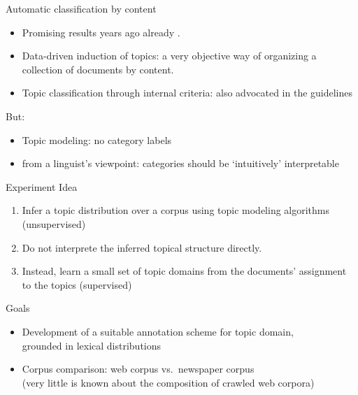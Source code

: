 \documentclass{beamer}
\begin{document}
\begin{frame}
  {Automatic classification by content}  
  \begin{itemize}
    \item Promising results years ago already \citep{Sebastiani2002}.
    \item \alert{Data-driven induction of topics}: a very objective way of organizing a collection of documents by content.
    \item Topic classification through internal criteria: also advocated in the \citet{EAGLES1996} guidelines
   \end{itemize}
  
  \vspace{0.5cm}     
  But:
  \begin{itemize}
    \item \alert{Topic modeling}: no category labels
    \item from a linguist's viewpoint: categories should be `intuitively' interpretable
  \end{itemize}
  \end{frame}


  \begin{frame}
    {Experiment}
    Idea
    \begin{enumerate}
      \item Infer a topic distribution over a corpus using topic modeling algorithms (\alert{unsupervised})
      \item Do not interprete the inferred topical structure directly.
      \item Instead, learn a small set of topic domains from the documents' assignment to the topics (\alert{supervised})
    \end{enumerate}
\pause
    Goals
    \begin{itemize}
      \item Development of a suitable annotation scheme for topic domain,\\
      grounded in lexical distributions
      \item Corpus comparison: web corpus vs.\ newspaper corpus\\
       (very little is known about the composition of crawled web corpora)
    \end{itemize}
    \end{frame}
\end{document}
